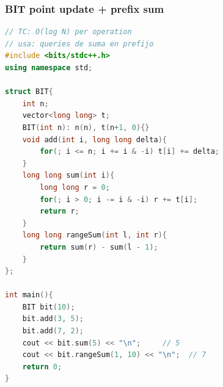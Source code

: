 \subsubsection{BIT point update + prefix sum}
\begin{lstlisting}[style=mystyle, language=C++]
// TC: O(log N) per operation
// usa: queries de suma en prefijo
#include <bits/stdc++.h>
using namespace std;

struct BIT{
	int n;
	vector<long long> t;
	BIT(int n): n(n), t(n+1, 0){}
	void add(int i, long long delta){
		for(; i <= n; i += i & -i) t[i] += delta;
	}
	long long sum(int i){
		long long r = 0;
		for(; i > 0; i -= i & -i) r += t[i];
		return r;
	}
	long long rangeSum(int l, int r){
		return sum(r) - sum(l - 1);
	}
};

int main(){
	BIT bit(10);
	bit.add(3, 5);
	bit.add(7, 2);
	cout << bit.sum(5) << "\n";     // 5
	cout << bit.rangeSum(1, 10) << "\n";  // 7
	return 0;
}
\end{lstlisting}
